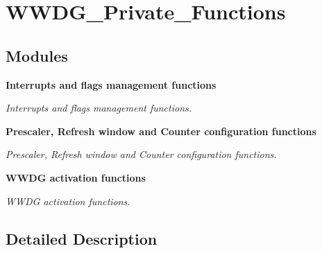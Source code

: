 \section{W\+W\+D\+G\+\_\+\+Private\+\_\+\+Functions}
\label{group__WWDG__Private__Functions}
\subsection*{Modules}
\begin{DoxyCompactItemize}
\item 
\textbf{ Interrupts and flags management functions}
\begin{DoxyCompactList}\small\item\em Interrupts and flags management functions. \end{DoxyCompactList}\item 
\textbf{ Prescaler, Refresh window and Counter configuration functions}
\begin{DoxyCompactList}\small\item\em Prescaler, Refresh window and Counter configuration functions. \end{DoxyCompactList}\item 
\textbf{ W\+W\+D\+G activation functions}
\begin{DoxyCompactList}\small\item\em W\+W\+DG activation functions. \end{DoxyCompactList}\end{DoxyCompactItemize}


\subsection{Detailed Description}
